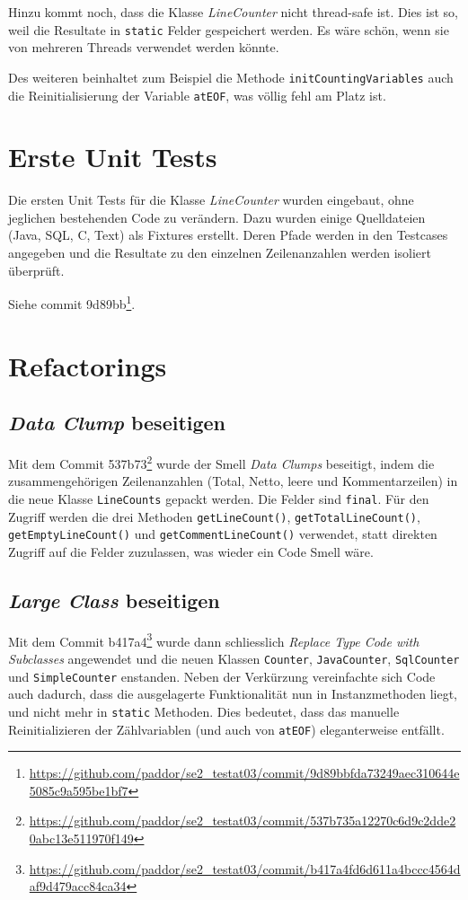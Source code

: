 \documentclass[a4paper]{article}
\newcommand{\java}[1]{\lstinline[style=customjava]{#1}} %
\begin{document}
Hinzu kommt noch, dass die Klasse \emph{LineCounter} nicht thread-safe ist.
Dies ist so, weil die Resultate in \java{static} Felder gespeichert werden. Es
w\"are sch\"on, wenn sie von mehreren Threads verwendet werden k\"onnte.

Des weiteren beinhaltet zum Beispiel die Methode \java{initCountingVariables}
auch die Reinitialisierung der Variable \java{atEOF}, was v\"ollig fehl am
Platz ist.

\section{Erste Unit Tests}
Die ersten Unit Tests f\"ur die Klasse \emph{LineCounter} wurden eingebaut,
ohne jeglichen bestehenden Code zu ver\"andern. Dazu wurden einige Quelldateien
(Java, SQL, C, Text) als Fixtures erstellt. Deren Pfade werden in den Testcases
angegeben und die Resultate zu den einzelnen Zeilenanzahlen werden isoliert
\"uberpr\"uft.

Siehe commit
9d89bb\footnote{\url{https://github.com/paddor/se2_testat03/commit/9d89bbfda73249aec310644e5085c9a595be1bf7}}.

\section{Refactorings}

\subsection{\emph{Data Clump} beseitigen}
Mit dem Commit
537b73\footnote{\url{https://github.com/paddor/se2_testat03/commit/537b735a12270c6d9c2dde20abc13e511970f149}}
wurde der Smell \emph{Data Clumps} beseitigt, indem die zusammengeh\"origen
Zeilenanzahlen (Total, Netto, leere und Kommentarzeilen) in die neue Klasse
\java{LineCounts} gepackt werden. Die Felder sind \java{final}. F\"ur den
Zugriff werden die drei Methoden \java{getLineCount()},
\java{getTotalLineCount()}, \java{getEmptyLineCount()} und
\java{getCommentLineCount()} verwendet, statt direkten Zugriff auf die Felder
zuzulassen, was wieder ein Code Smell w\"are.

\subsection{\emph{Large Class} beseitigen}
Mit dem Commit
b417a4\footnote{\url{https://github.com/paddor/se2_testat03/commit/b417a4fd6d611a4bccc4564daf9d479acc84ca34}}
wurde dann schliesslich \emph{Replace Type Code with Subclasses} angewendet und
die neuen Klassen \java{Counter}, \java{JavaCounter}, \java{SqlCounter} und
\java{SimpleCounter} enstanden. Neben der Verk\"urzung vereinfachte sich Code
auch dadurch, dass die ausgelagerte Funktionalit\"at nun in Instanzmethoden
liegt, und nicht mehr in \java{static} Methoden. Dies bedeutet, dass das
manuelle Reinitializieren der Z\"ahlvariablen (und auch von \java{atEOF})
eleganterweise entf\"allt.
\end{document}
